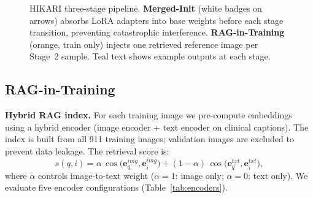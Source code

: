 \documentclass[conference,a4paper]{IEEEtran}
\begin{document}
\begin{figure}[t]
\caption{HIKARI three-stage pipeline. \textbf{Merged-Init} (white badges
on arrows) absorbs LoRA adapters into base weights before each stage
transition, preventing catastrophic interference. \textbf{RAG-in-Training}
(orange, train only) injects one retrieved reference image per Stage~2
sample. Teal text shows example outputs at each stage.}
\label{fig:pipeline}
\end{figure}

\subsection{RAG-in-Training}
\label{sec:rag}

\textbf{Hybrid RAG index.}
For each training image we pre-compute embeddings using a hybrid encoder
(image encoder + text encoder on clinical captions).
The index is built from all 911 training images; validation images are
excluded to prevent data leakage.  The retrieval score is:
\begin{equation}
s(q,i) = \alpha\,\cos\!\bigl(\mathbf{e}^{img}_{q},\mathbf{e}^{img}_{i}\bigr)
        + (1{-}\alpha)\,\cos\!\bigl(\mathbf{e}^{txt}_{q},\mathbf{e}^{txt}_{i}\bigr),
\label{eq:score}
\end{equation}
where $\alpha$ controls image-to-text weight ($\alpha{=}1$: image only;
$\alpha{=}0$: text only).
We evaluate five encoder configurations (Table~\ref{tab:encoders}).
\end{document}

